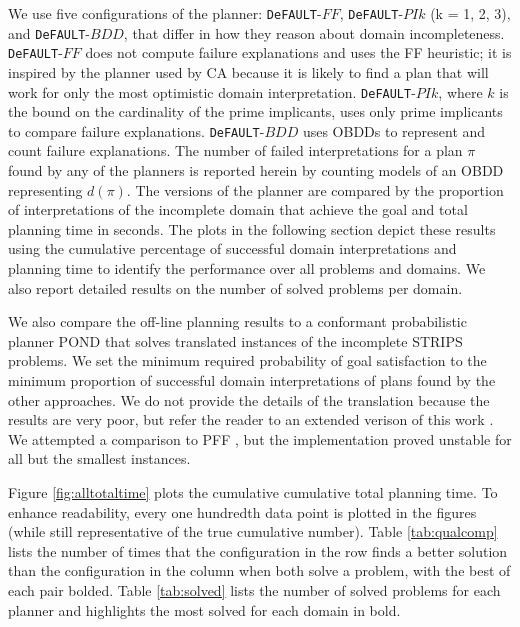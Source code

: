 \documentclass{article}
\def\citep#1{\cite{#1}} \def\citet#1{\citeA{#1}}
\def\und#1{\noindent{\bf #1}:}
\def\FFRISKY{{\tt DeFAULT}}
\def\und#1{\medskip{\noindent\bf #1:}}
\begin{document}
We use five configurations of the planner: \FFRISKY{}-$FF$, \FFRISKY{}-$PIk$ (k
= 1, 2, 3), and \FFRISKY{}-$BDD$, that differ in how they reason about domain
incompleteness.  \FFRISKY{}-$FF$ does not compute failure explanations and uses
the FF heuristic;  it is inspired by the planner used by CA because it is likely
to find a plan that will work for only the most optimistic domain
interpretation.  \FFRISKY{}-$PIk$, where $k$ is the bound on the cardinality of
the prime implicants, uses only prime implicants to compare failure
explanations.  \FFRISKY{}-$BDD$ uses OBDDs to represent and count failure
explanations.  The number of failed interpretations for a plan $\pi$ found by
any of the planners is reported herein by counting models of an OBDD
representing $d(\pi)$. The versions of the planner are compared by the
proportion of interpretations of the incomplete domain that achieve the goal and
total planning time in seconds. The plots in the following section depict these
results using the cumulative percentage of successful domain interpretations and
planning time to identify the performance over all problems and domains.  We
also report detailed results on the number of solved problems per domain.

We also compare the off-line planning results to a conformant probabilistic
planner POND \citep{aij-mclug} that solves translated instances of the incomplete
STRIPS problems.  We set the minimum required probability of goal satisfaction
to the minimum proportion of successful domain interpretations of plans found by
the other approaches. We do not provide the details of the translation because
the results are very poor, but refer the reader to an extended verison of this work \citep{USU-CS-TR-11-001}.  We attempted a comparison to PFF \citep{pff}, but the implementation proved unstable for all but the smallest instances. 

\und{Off-line Planning Results} Figure \ref{fig:alltotaltime} plots the
cumulative cumulative total planning time.  To enhance readability, every one
hundredth data point is plotted in the figures (while still representative of the true cumulative
number).  Table \ref{tab:qualcomp} lists the number of times that the
configuration in the row finds a better solution than the configuration in the
column when both solve a problem, with the best of each pair bolded. Table
\ref{tab:solved} lists the number of solved problems for each planner and
highlights the most solved for each domain in bold. 
\end{document}
